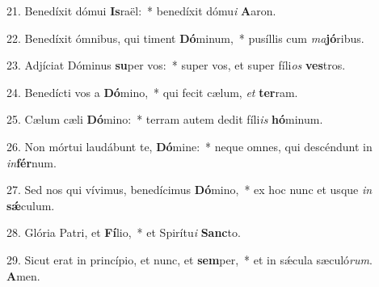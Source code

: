 21. Benedíxit dómui \textbf{Is}raël:~*  benedíxit dómu\textit{i} \textbf{A}aron.\

22. Benedíxit ómnibus, qui timent \textbf{Dó}minum,~*  pusíllis cum \textit{ma}\textbf{jó}ribus.\

23. Adjíciat Dóminus \textbf{su}per vos:~*  super vos, et super fíli\textit{os} \textbf{ves}tros.\

24. Benedícti vos a \textbf{Dó}mino,~*  qui fecit cælum, \textit{et} \textbf{ter}ram.\

25. Cælum cæli \textbf{Dó}mino:~*  terram autem dedit fíli\textit{is} \textbf{hó}minum.\

26. Non mórtui laudábunt te, \textbf{Dó}mine:~*  neque omnes, qui descéndunt in \textit{in}\textbf{fér}num.\

27. Sed nos qui vívimus, benedícimus \textbf{Dó}mino,~*  ex hoc nunc et usque \textit{in} \textbf{sǽ}culum.\

28. Glória Patri, et \textbf{Fí}lio,~*  et Spirítu\textit{i} \textbf{Sanc}to.\

29. Sicut erat in princípio, et nunc, et \textbf{sem}per,~*  et in sǽcula sæculó\textit{rum}. \textbf{A}men.\

